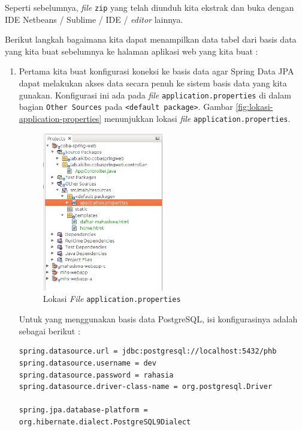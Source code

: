 Seperti sebelumnya, \textit{file} \texttt{zip} yang telah diunduh kita ekstrak dan buka dengan IDE Netbeans / Sublime / IDE / \textit{editor} lainnya.

Berikut langkah bagaimana kita dapat menampilkan data tabel dari basis data yang kita buat sebelumnya ke halaman aplikasi web yang kita buat :

\begin{enumerate}
	\item Pertama kita buat konfigurasi koneksi ke basis data agar Spring Data JPA dapat melakukan akses data secara penuh ke sistem basis data yang kita gunakan. Konfigurasi ini ada pada \textit{file} \texttt{application.properties} di dalam bagian \texttt{Other Sources} pada \texttt{<default package>}. Gambar \ref{fig:lokasi-application-properties} menunjukkan lokasi \textit{file} \texttt{application.properties}. 
	
	\begin{figure}[H]
		\centering
		\includegraphics[width=0.5\textwidth]{./resources/010-lokasi-application-properties}
		\caption{Lokasi \textit{File} \texttt{application.properties}}
		\label{rfig:lokasi-application-properties}
	\end{figure}
	
	Untuk yang menggunakan basis data PostgreSQL, isi konfigurasinya adalah sebagai berikut :
	
	\begin{lstlisting}
spring.datasource.url = jdbc:postgresql://localhost:5432/phb
spring.datasource.username = dev
spring.datasource.password = rahasia
spring.datasource.driver-class-name = org.postgresql.Driver

spring.jpa.database-platform = org.hibernate.dialect.PostgreSQL9Dialect
	\end{lstlisting}
	

\end{enumerate}
